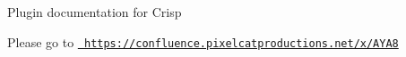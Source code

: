 Plugin documentation for Crisp

Please go to \href{https://confluence.pixelcatproductions.net/x/AYA8}{\texttt{ https\+://confluence.\+pixelcatproductions.\+net/x/\+A\+Y\+A8}} 